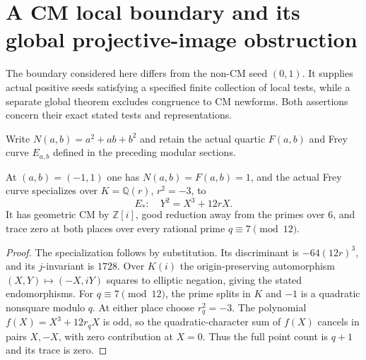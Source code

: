 \section{A CM local boundary and its global projective-image obstruction}
\label{cb-section}

The boundary considered here differs from the non-CM seed $(0,1)$.
It supplies actual positive seeds satisfying a specified finite collection
of local tests, while a separate global theorem excludes congruence to
CM newforms. Both assertions concern their exact stated tests and
representations.

Write $N(a,b)=a^2+ab+b^2$ and retain the actual quartic $F(a,b)$
and Frey curve $E_{a,b}$ defined in the preceding modular sections.

\begin{lemma}\label{cb-cm-boundary}
At $(a,b)=(-1,1)$ one has $N(a,b)=F(a,b)=1$, and the actual Frey
curve specializes over $K=\mathbb Q(r)$, $r^2=-3$, to
\[
 E_*:\quad Y^2=X^3+12rX.
\]
It has geometric CM by $\mathbb Z[i]$, good reduction away from the
primes over $6$, and trace zero at both places over every rational
prime $q\equiv7\pmod{12}$.
\end{lemma}
\begin{proof}
The specialization follows by substitution. Its discriminant is
$-64(12r)^3$, and its $j$-invariant is $1728$. Over $K(i)$ the
origin-preserving automorphism $(X,Y)\mapsto(-X,iY)$ squares to
elliptic negation, giving the stated endomorphisms.
For $q\equiv7\pmod{12}$, the prime splits in $K$ and $-1$ is a
quadratic nonsquare modulo $q$. At either place choose $r_q^2=-3$.
The polynomial $f(X)=X^3+12r_qX$ is odd, so the quadratic-character
sum of $f(X)$ cancels in pairs $X,-X$, with zero contribution at
$X=0$. Thus the full point count is $q+1$ and its trace is zero.
\end{proof}

